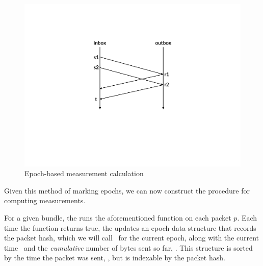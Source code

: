 \begin{figure}
    \centering
    \includegraphics[width=\columnwidth]{img/rate-calculation}
    \caption{Epoch-based measurement calculation}\label{fig:ratecalc}
\end{figure}

Given this method of marking epochs, we can now construct the procedure for computing measurements.

For a given bundle, the \inbox runs the aforementioned function on each packet $p$. Each time
the function returns true, the \inbox updates an epoch data structure that records the packet hash,
which we will call \hptwo\ for the current epoch, 
along with the current time \stwo\ and the \emph{cumulative} number of bytes sent so far, \senttwo. This structure
is sorted by the time the packet was sent, \stwo, but is indexable by the packet hash.

